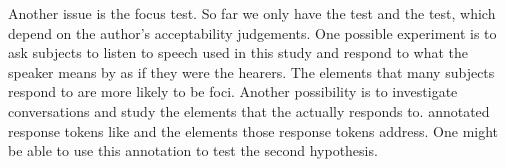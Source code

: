 Another issue is the focus test.
So far we only have the  test and the  test,
which depend on the author's acceptability judgements.
One possible experiment is to ask subjects to listen to speech used in this study
and respond to what the speaker means by 
as if they were the hearers.
The elements that many subjects respond to are more likely to be foci.
Another possibility is to investigate conversations and study the elements that the  actually responds to.
 annotated response tokens like  and the elements those response tokens address.
One might be able to use this annotation to test the second hypothesis.

